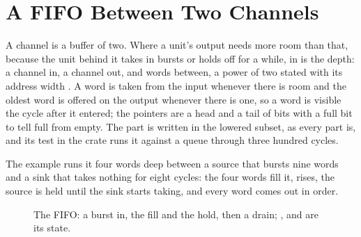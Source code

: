 \section{A FIFO Between Two Channels}
\label{sec:x-queue}

A channel is a buffer of two. Where a unit's output needs more room
than that, because the unit behind it takes in bursts or holds off
for a while,  in  is the depth: a
channel in, a channel out, and  words between, a
power of two stated with its address width . A word is
taken from the input whenever there is room and the oldest word is
offered on the output whenever there is one, so a word is visible the
cycle after it entered; the pointers are a head and a tail of
 bits with a full bit to tell full from empty. The part is
written in the lowered subset, as every part is, and its test in the
crate runs it against a queue through three hundred cycles.

The example runs it four words deep between a source that bursts
nine words and a sink that takes nothing for eight cycles: the four
words fill it,  rises, the source is held until the sink
starts taking, and every word comes out in order.

\begin{figure}[htbp]
\centering

\caption{The FIFO: a burst in, the fill and the hold, then a drain;
,  and  are its state.}
\label{fig:x-queue}
\end{figure}




